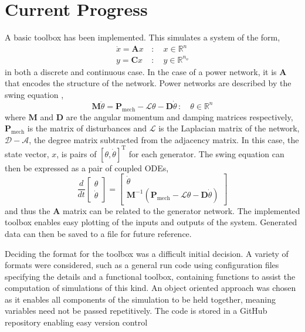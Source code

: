 \documentclass[11pt,a4paper]{article}
\begin{document}
\section*{Current Progress}
A basic toolbox has been implemented. This simulates a system of the form, 
\begin{equation*}
\begin{split}
\dot{x} = \textbf{A}x \,&: \quad x \in \mathbb{R}^{n} \\
y = \textbf{C}x \, &: \quad y \in \mathbb{R}^{n_o}
\end{split}
\end{equation*}
in both a discrete and continuous case. In the case of a power network, it is $\textbf{A}$ that encodes the structure of the network. Power networks are described by the swing equation \cite[eq 5.8]{Machowski1997},
\begin{equation*}
\textbf{M} \ddot{\theta} = \textbf{P}_{\text{mech}} - \mathcal{L}\theta - \textbf{D}\dot{\theta} \, : \quad \theta \in \mathbb{R}^n
\end{equation*}
where $\textbf{M}$ and $\textbf{D}$ are the angular momentum and damping matrices respectively, $\textbf{P}_{\text{mech}}$ is the matrix of disturbances and $\mathcal{L}$ is the Laplacian matrix of the network, $\mathcal{D}-\mathcal{A}$, the degree matrix subtracted from the adjacency matrix. In this case, the state vector, $x$, is pairs of $[\theta, \dot{\theta}]^{\text{T}}$ for each generator. The swing equation can then be expressed as a pair of coupled ODEs,
\begin{equation*}
\frac{d}{dt}\begin{bmatrix}
\theta \\
\dot{\theta}
\end{bmatrix}
= \begin{bmatrix}
\dot{\theta} \\
\textbf{M}^{-1} (\textbf{P}_{\text{mech}} - \mathcal{L}\theta - \textbf{D}\dot{\theta})
\end{bmatrix}
\end{equation*}
and thus the $\textbf{A}$ matrix can be related to the generator network.
 The implemented toolbox enables easy plotting of the inputs and outputs of the system. Generated data can then be saved to a file for future reference. 

Deciding the format for the toolbox was a difficult initial decision. A variety of formats were considered, such as a general run code using configuration files specifying the details and a functional toolbox, containing functions to assist the computation of simulations of this kind. An object oriented approach was chosen as it enables all components of the simulation to be held together, meaning variables need not be passed repetitively. The code is stored in a GitHub repository enabling easy version control
\end{document}
